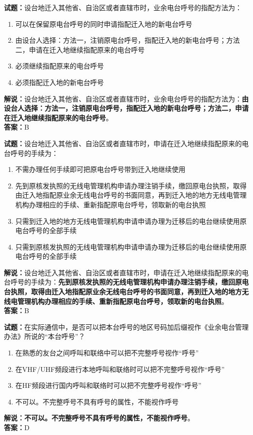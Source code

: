 \documentclass{ctexbook}
\begin{document}
\vspace{\baselineskip}

\noindent\textbf{试题：}设台地迁入其他省、自治区或者直辖市时，业余电台呼号的指配方法为：
\begin{enumerate}[leftmargin=3em]
  \item 可以在保留原电台呼号的同时申请指配迁入地的新电台呼号
  \item 由设台人选择：方法一，注销原电台呼号，指配迁入地的新电台呼号；方法二，申请在迁入地继续指配原来的电台呼号
  \item 必须继续指配原来的电台呼号
  \item 必须指配迁入地的新电台呼号
\end{enumerate}
\noindent\textbf{解说：}设台地迁入其他省、自治区或者直辖市时，业余电台呼号的指配方法为：\textbf{由设台人选择：方法一，注销原电台呼号，指配迁入地的新电台呼号；方法二，申请在迁入地继续指配原来的电台呼号}。\\\noindent\textbf{答案：}B

\vspace{\baselineskip}

\noindent\textbf{试题：}设台地迁入其他省、自治区或者直辖市时，申请在迁入地继续指配原来的电台呼号的手续为：
\begin{enumerate}[leftmargin=3em]
  \item 不需办理任何手续即可把原电台呼号带到迁入地继续使用
  \item 先到原核发执照的无线电管理机构申请办理注销手续，缴回原电台执照，取得由迁入地指配原业余无线电台呼号的书面同意，再到迁入地的地方无线电管理机构办理相应的手续、重新指配原电台呼号，领取新的电台执照
  \item 只需到迁入地的地方无线电管理机构申请申请办理为迁移后的电台继续使用原电台呼号的全部手续
  \item 只需到原核发执照的无线电管理机构申请申请办理为迁移后的电台继续使用原电台呼号的全部手续
\end{enumerate}
\noindent\textbf{解说：}设台地迁入其他省、自治区或者直辖市时，申请在迁入地继续指配原来的电台呼号的手续为：\textbf{先到原核发执照的无线电管理机构申请办理注销手续，缴回原电台执照，取得由迁入地指配原业余无线电台呼号的书面同意，再到迁入地的地方无线电管理机构办理相应的手续、重新指配原电台呼号，领取新的电台执照}。\\\noindent\textbf{答案：}B

\vspace{\baselineskip}

\noindent\textbf{试题：}在实际通信中，是否可以把本台呼号的地区号码加后缀视作《业余电台管理办法》所说的“本台呼号”？
\begin{enumerate}[leftmargin=3em]
  \item 在熟悉的友台之间呼叫和联络中可以把不完整呼号视作“呼号”
  \item 在VHF/UHF频段进行本地呼叫和联络时可以把不完整呼号视作“呼号”
  \item 在HF频段进行国内呼叫和联络时可以把不完整呼号视作“呼号”
  \item 不可以。不完整呼号不具有呼号的属性，不能视作呼号
\end{enumerate}
\textbf{解说：不可以。不完整呼号不具有呼号的属性，不能视作呼号}。\\\noindent\textbf{答案：}D
\end{document}
